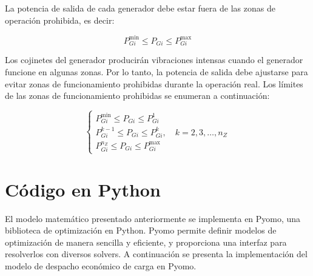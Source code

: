 \documentclass[11pt]{article}
\begin{document}
La potencia de salida de cada generador debe estar fuera de las zonas de operación prohibida, es decir:

\begin{equation}
    P_{Gi}^{\min} \leq P_{Gi} \leq P_{Gi}^{\max}
\end{equation}

Los cojinetes del generador producirán vibraciones intensas cuando el generador funcione en algunas
zonas. Por lo tanto, la potencia de salida debe ajustarse para evitar zonas de funcionamiento prohibidas durante
la operación real. Los límites de las zonas de funcionamiento prohibidas se enumeran a continuación:

\begin{equation}
    \left\{
    \begin{array}{l}
        P_{Gi}^{\min} \leq P_{Gi} \leq P_{Gi}^{1} \\[8pt]
        P_{Gi}^{k-1} \leq P_{Gi} \leq P_{Gi}^{k}, \quad k = 2,3,\dots,n_Z \\[8pt]
        P_{Gi}^{n_Z} \leq P_{Gi} \leq P_{Gi}^{\max}
    \end{array}
    \right.
\end{equation}

\newpage
\section{Código en Python}
El modelo matemático presentado anteriormente se implementa en Pyomo, una biblioteca de optimización en Python. Pyomo permite definir modelos de optimización de manera sencilla y eficiente, y proporciona una interfaz para resolverlos con diversos solvers. A continuación se presenta la implementación del modelo de despacho económico de carga en Pyomo.
\end{document}
